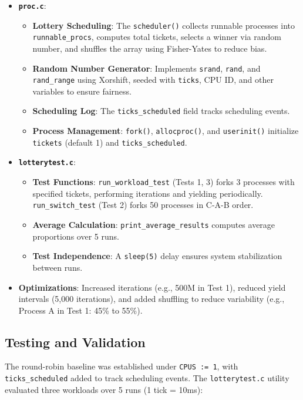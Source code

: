 \documentclass[12pt]{article}
\begin{document}
\begin{itemize}
  \item \textbf{\texttt{proc.c}}:
    \begin{itemize}
      \item \textbf{Lottery Scheduling}: The \texttt{scheduler()} collects runnable processes into \texttt{runnable\_procs}, computes total tickets, selects a winner via random number, and shuffles the array using Fisher-Yates to reduce bias.
      \item \textbf{Random Number Generator}: Implements \texttt{srand}, \texttt{rand}, and \texttt{rand\_range} using Xorshift, seeded with \texttt{ticks}, CPU ID, and other variables to ensure fairness.
      \item \textbf{Scheduling Log}: The \texttt{ticks\_scheduled} field tracks scheduling events.
      \item \textbf{Process Management}: \texttt{fork()}, \texttt{allocproc()}, and \texttt{userinit()} initialize \texttt{tickets} (default 1) and \texttt{ticks\_scheduled}.
    \end{itemize}
  \item \textbf{\texttt{lotterytest.c}}:
    \begin{itemize}
      \item \textbf{Test Functions}: \texttt{run\_workload\_test} (Tests 1, 3) forks 3 processes with specified tickets, performing iterations and yielding periodically. \texttt{run\_switch\_test} (Test 2) forks 50 processes in C-A-B order.
      \item \textbf{Average Calculation}: \texttt{print\_average\_results} computes average proportions over 5 runs.
      \item \textbf{Test Independence}: A \texttt{sleep(5)} delay ensures system stabilization between runs.
    \end{itemize}
  \item \textbf{Optimizations}: Increased iterations (e.g., 500M in Test 1), reduced yield intervals (5,000 iterations), and added shuffling to reduce variability (e.g., Process A in Test 1: 45\% to 55\%).
\end{itemize}

\subsection{Testing and Validation}
\label{subsec:lottery-testing}

The round-robin baseline was established under \texttt{CPUS := 1}, with \texttt{ticks\_scheduled} added to track scheduling events. The \texttt{lotterytest.c} utility evaluated three workloads over 5 runs (1 tick = 10ms):
\end{document}
